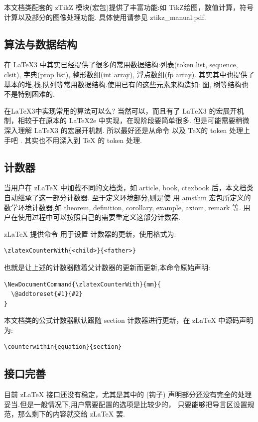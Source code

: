 \begin{remark}
本文档类配套的 {zTikZ} 模块(宏包)提供了丰富功能:如 TikZ绘图，数值计算，符号计算以及部分的图像处理功能. 具体使用请参见
ztikz\_manual.pdf.
\end{remark}

\subsection{算法与数据结构}
在 \LaTeX{}3 中其实已经提供了很多的常用数据结构:列表(token list, sequence, clsit), 字典(prop list), 整形数组(int array), 
浮点数组(fp array). 其实其中也提供了基本的堆,栈,队列等常用数据结构.使用已有的这些元素来构造如: 图, 树等结构也不是特别困难的.

在\LaTeX3中实现常用的算法可以么? 当然可以，而且有了 \LaTeX3 的宏展开机制，相较于在原本的 \LaTeX 2e 中实现，在现阶段要简单很多.
但是可能需要稍微深入理解 \LaTeX3 的宏展开机制. 所以最好还是从命令 \cmd{\expandafter} 以及 \TeX 的 token 处理上手吧 \cmd{>_<}.
其实也不用深入到 \TeX{} 的 token 处理. 

\subsection{计数器}
当用户在 z\LaTeX{} 中加载不同的文档类，如 article, book, ctexbook 后，本文档类自动继承了这一部分计数器. 至于定义环境部分,则是使
用 {amsthm} 宏包所定义的数学环境计数器,如 theorem, definition, corollary, example, axiom, remark 等. 
用户在使用过程中可以按照自己的需要重定义这部分计数器.

z\LaTeX{} 提供命令\cmd{\zlatexCounterWith}\index{\cmd{\zlatexCounterWith}} 用于设置
计数器的更新，使用格式为:
\begin{verbatim}
\zlatexCounterWith{<child>}{<father>}
\end{verbatim}

也就是让上述的计数器随着父计数器的更新而更新,本命令原始声明:
\begin{verbatim}
\NewDocumentCommand{\zlatexCounterWith}{mm}{
  \@addtoreset{#1}{#2}
}
\end{verbatim}

本文档类的公式计数器默认跟随 {section} 计数器进行更新，在 z\LaTeX{} 中源码声明为:
\begin{verbatim}
\counterwithin{equation}{section}
\end{verbatim}

\subsection{接口完善}
目前 z\LaTeX{} 接口还没有稳定，尤其是其中的 (钩子) 声明部分还没有完全的处理妥当.但是一般情况下,用户需要配置的选项是比较少的，
只要能够把导言区设置规范，那么剩下的内容就交给 z\LaTeX{} 罢.


